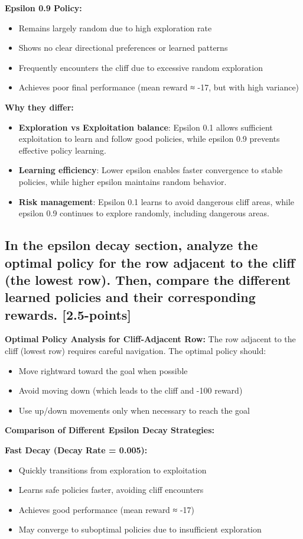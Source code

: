 \documentclass[12pt]{article}
\begin{document}
{{{\textbf{Epsilon 0.9 Policy:}
\begin{itemize}
    \item Remains largely random due to high exploration rate
    \item Shows no clear directional preferences or learned patterns
    \item Frequently encounters the cliff due to excessive random exploration
    \item Achieves poor final performance (mean reward ≈ -17, but with high variance)
\end{itemize}

\textbf{Why they differ:}
\begin{itemize}
    \item \textbf{Exploration vs Exploitation balance}: Epsilon 0.1 allows sufficient exploitation to learn and follow good policies, while epsilon 0.9 prevents effective policy learning.
    \item \textbf{Learning efficiency}: Lower epsilon enables faster convergence to stable policies, while higher epsilon maintains random behavior.
    \item \textbf{Risk management}: Epsilon 0.1 learns to avoid dangerous cliff areas, while epsilon 0.9 continues to explore randomly, including dangerous areas.
\end{itemize}

\subsection{In the epsilon decay section, analyze the optimal policy for the row adjacent to the cliff (the lowest row). Then, compare the different learned policies and their corresponding rewards. [2.5-points]}

\textbf{Optimal Policy Analysis for Cliff-Adjacent Row:}
The row adjacent to the cliff (lowest row) requires careful navigation. The optimal policy should:
\begin{itemize}
    \item Move rightward toward the goal when possible
    \item Avoid moving down (which leads to the cliff and -100 reward)
    \item Use up/down movements only when necessary to reach the goal
\end{itemize}

\textbf{Comparison of Different Epsilon Decay Strategies:}

\textbf{Fast Decay (Decay Rate = 0.005):}
\begin{itemize}
    \item Quickly transitions from exploration to exploitation
    \item Learns safe policies faster, avoiding cliff encounters
    \item Achieves good performance (mean reward ≈ -17)
    \item May converge to suboptimal policies due to insufficient exploration
\end{itemize}

}}}
\end{document}
